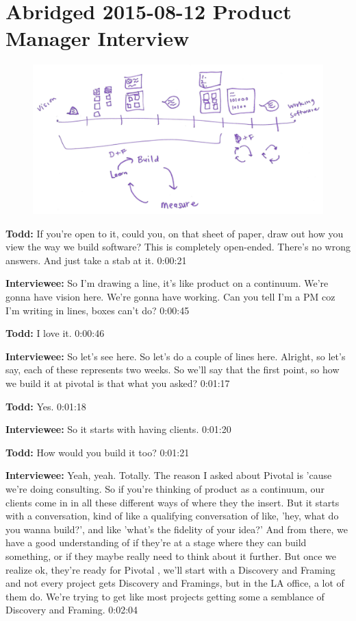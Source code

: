 \section{Abridged 2015-08-12 Product Manager Interview}

\begin{figure}[h]
\centering
\includegraphics[width=6.5in]{interviews/drawings/2015_08_12_pm.png}
\caption{}
\label{2015_08_12_pm}
\end{figure}


\textbf{Todd:} If you're open to it, could you, on that sheet of paper, draw out how you view the way we build software? This is completely open-ended. There's no wrong answers. And just take a stab at it.  0:00:21

\textbf{Interviewee:} So I'm drawing a line, it's like product on a continuum. We're gonna have vision here. We're gonna have working. Can you tell I'm a PM coz I'm writing in lines, boxes can't do? 0:00:45

\textbf{Todd:} I love it.  0:00:46

\textbf{Interviewee:} So let's see here. So let's do a couple of lines here. Alright, so let's say, each of these represents two weeks.  So we'll say that the first point, so how we build it at pivotal is that what you asked?  0:01:17

\textbf{Todd:} Yes.  0:01:18

\textbf{Interviewee:} So it starts with having clients.  0:01:20

\textbf{Todd:} How would you build it too?  0:01:21

\textbf{Interviewee:} Yeah, yeah. Totally. The reason I asked about Pivotal is 'cause we're doing consulting. So if you're thinking of product as a continuum, our clients come in in all these different ways of where they the insert. But it starts with a conversation, kind of like a qualifying conversation of like, 'hey, what do you wanna build?', and like 'what's the fidelity of your idea?' And from there, we have a good understanding of if they're at a stage where they can build something, or if they maybe really need to think about it further.  But once we realize ok, they're ready for Pivotal , we'll start with a Discovery and Framing and not every project gets Discovery and Framings, but in the LA office, a lot of them do.  We're trying to get like most projects getting some a semblance of Discovery and Framing.   0:02:04

